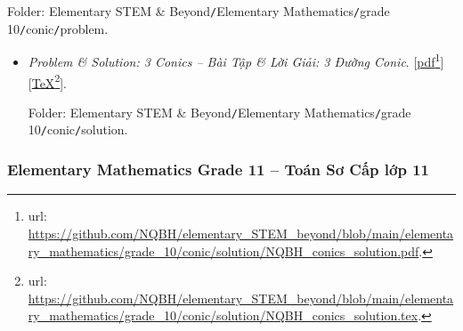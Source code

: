 \documentclass[12pt,twoside]{book}
\begin{document}
\begin{enumerate}
	Folder: {\sf Elementary STEM \& Beyond{\tt/}Elementary Mathematics{\tt/}grade 10{\tt/}conic{\tt/}problem}.
	\begin{itemize}
		\item {\it Problem \& Solution: 3 Conics -- Bài Tập \& Lời Giải: 3 Đường Conic}. [\href{https://github.com/NQBH/elementary_STEM_beyond/blob/main/elementary_mathematics/grade_10/conic/solution/NQBH_conics_solution.pdf}{pdf}\footnote{{\sc url}: \url{https://github.com/NQBH/elementary_STEM_beyond/blob/main/elementary_mathematics/grade_10/conic/solution/NQBH_conics_solution.pdf}.}][\href{https://github.com/NQBH/elementary_STEM_beyond/blob/main/elementary_mathematics/grade_10/conic/solution/NQBH_conics_solution.tex}{\TeX}\footnote{{\sc url}: \url{https://github.com/NQBH/elementary_STEM_beyond/blob/main/elementary_mathematics/grade_10/conic/solution/NQBH_conics_solution.tex}.}].
		
		Folder: {\sf Elementary STEM \& Beyond{\tt/}Elementary Mathematics{\tt/}grade 10{\tt/}conic{\tt/}solution}.
	\end{itemize}
\end{enumerate}

\subsubsection{Elementary Mathematics Grade 11 -- Toán Sơ Cấp lớp 11}
\end{document}
